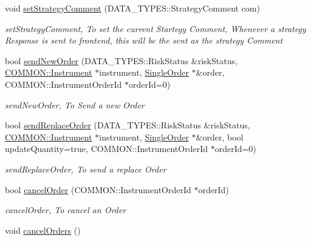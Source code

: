 \begin{DoxyCompactItemize}
void \hyperlink{class_a_p_i2_1_1_s_g_context_a09b8988f91af279b0adab42363dad20d}{set\-Strategy\-Comment} (D\-A\-T\-A\-\_\-\-T\-Y\-P\-E\-S\-::\-Strategy\-Comment com)
\begin{DoxyCompactList}\small\item\em set\-Strategy\-Comment, To set the current Startegy Comment, Whenever a strategy Response is sent to frontend, this will be the sent as the strategy Comment \end{DoxyCompactList}\item 
bool \hyperlink{class_a_p_i2_1_1_s_g_context_a13e9de988513ba35eb22950c70c9f7f0}{send\-New\-Order} (D\-A\-T\-A\-\_\-\-T\-Y\-P\-E\-S\-::\-Risk\-Status \&risk\-Status, \hyperlink{class_a_p_i2_1_1_c_o_m_m_o_n_1_1_instrument}{C\-O\-M\-M\-O\-N\-::\-Instrument} $\ast$instrument, \hyperlink{class_a_p_i2_1_1_single_order}{Single\-Order} $\ast$\&order, C\-O\-M\-M\-O\-N\-::\-Instrument\-Order\-Id $\ast$order\-Id=0)
\begin{DoxyCompactList}\small\item\em send\-New\-Order, To Send a new Order \end{DoxyCompactList}\item 
bool \hyperlink{class_a_p_i2_1_1_s_g_context_a969d2c63a85582133beeb6c657727ec7}{send\-Replace\-Order} (D\-A\-T\-A\-\_\-\-T\-Y\-P\-E\-S\-::\-Risk\-Status \&risk\-Status, \hyperlink{class_a_p_i2_1_1_c_o_m_m_o_n_1_1_instrument}{C\-O\-M\-M\-O\-N\-::\-Instrument} $\ast$instrument, \hyperlink{class_a_p_i2_1_1_single_order}{Single\-Order} $\ast$\&order, bool update\-Quantity=true, C\-O\-M\-M\-O\-N\-::\-Instrument\-Order\-Id $\ast$order\-Id=0)
\begin{DoxyCompactList}\small\item\em send\-Replace\-Order, To send a replace Order \end{DoxyCompactList}\item 
bool \hyperlink{class_a_p_i2_1_1_s_g_context_ae919ca5df7d0e8ecd686e5be7e24d737}{cancel\-Order} (C\-O\-M\-M\-O\-N\-::\-Instrument\-Order\-Id $\ast$order\-Id)
\begin{DoxyCompactList}\small\item\em cancel\-Order, To cancel an Order \end{DoxyCompactList}\item 
\hypertarget{class_a_p_i2_1_1_s_g_context_a639ea0f4f942043c2dbf3992d4fd8a96}{void \hyperlink{class_a_p_i2_1_1_s_g_context_a639ea0f4f942043c2dbf3992d4fd8a96}{cancel\-Orders} ()}\label{class_a_p_i2_1_1_s_g_context_a639ea0f4f942043c2dbf3992d4fd8a96}


\end{DoxyCompactItemize}
